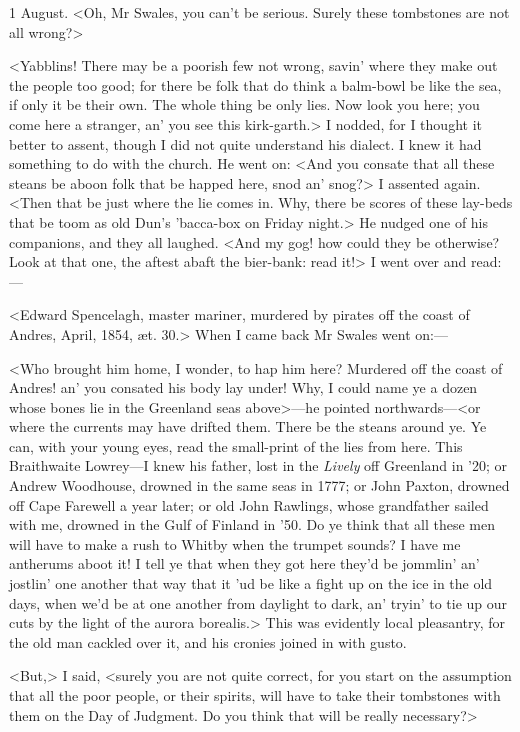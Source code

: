 \begin{diary}{1 August.}
<Oh, Mr Swales, you can't be serious. Surely these tombstones are not all wrong?>

<Yabblins! There may be a poorish few not wrong, savin' where they make out the people too good; for there be folk that do think a balm-bowl be like the sea, if only it be their own. The whole thing be only lies. Now look you here; you come here a stranger, an' you see this kirk-garth.> I nodded, for I thought it better to assent, though I did not quite understand his dialect. I knew it had something to do with the church. He went on: <And you consate that all these steans be aboon folk that be happed here, snod an' snog?> I assented again. <Then that be just where the lie comes in. Why, there be scores of these lay-beds that be toom as old Dun's 'bacca-box on Friday night.> He nudged one of his companions, and they all laughed. <And my gog! how could they be otherwise? Look at that one, the aftest abaft the bier-bank: read it!> I went over and read:—

<Edward Spencelagh, master mariner, murdered by pirates off the coast of Andres, April, 1854, æt. 30.> When I came back Mr Swales went on:—

<Who brought him home, I wonder, to hap him here? Murdered off the coast of Andres! an' you consated his body lay under! Why, I could name ye a dozen whose bones lie in the Greenland seas above>—he pointed northwards—<or where the currents may have drifted them. There be the steans around ye. Ye can, with your young eyes, read the small-print of the lies from here. This Braithwaite Lowrey—I knew his father, lost in the \textit{Lively} off Greenland in '20; or Andrew Woodhouse, drowned in the same seas in 1777; or John Paxton, drowned off Cape Farewell a year later; or old John Rawlings, whose grandfather sailed with me, drowned in the Gulf of Finland in '50. Do ye think that all these men will have to make a rush to Whitby when the trumpet sounds? I have me antherums aboot it! I tell ye that when they got here they'd be jommlin' an' jostlin' one another that way that it 'ud be like a fight up on the ice in the old days, when we'd be at one another from daylight to dark, an' tryin' to tie up our cuts by the light of the aurora borealis.> This was evidently local pleasantry, for the old man cackled over it, and his cronies joined in with gusto.

<But,> I said, <surely you are not quite correct, for you start on the assumption that all the poor people, or their spirits, will have to take their tombstones with them on the Day of Judgment. Do you think that will be really necessary?>


\end{diary}

